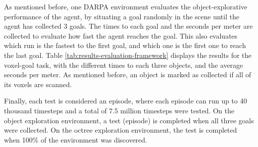 As mentioned before, one DARPA environment evaluates the object-explorative performance of the agent, by situating a goal randomly in the scene until the agent has collected 3 goals. The times to each goal and the seconds per meter are collected to evaluate how fast the agent reaches the goal. This also evaluates which run is the fastest to the first goal, and which one is the first one to reach the last goal. 
Table \ref{tab:results-evaluation-framework} displays the results for the voxel-goal task, with the different times to each three objects, and the average seconds per meter. As mentioned before, an object is marked as collected if all of its voxels are scanned.

Finally, each test is considered an episode, where each episode can run up to 40 thousand timesteps and a total of 7.5 million timesteps were tested. On the object exploration environment, a test (episode) is completed when all three goals were collected. On the octree exploration environment, the test is completed when 100\% of the environment was discovered.


